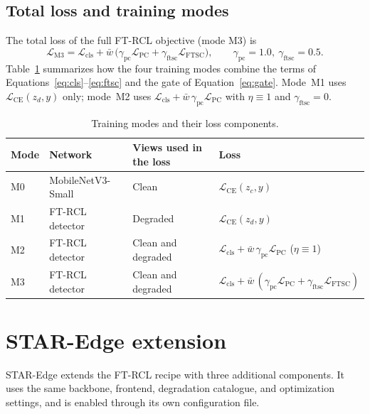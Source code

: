 \subsection{Total loss and training modes}

The total loss of the full FT-RCL objective (mode M3) is
\begin{equation}
\mathcal{L}_{\mathrm{M3}} = \mathcal{L}_{\mathrm{cls}} + \bar{w}\,\Big(\gamma_{\mathrm{pc}}\mathcal{L}_{\mathrm{PC}} + \gamma_{\mathrm{ftsc}}\mathcal{L}_{\mathrm{FTSC}}\Big), \qquad \gamma_{\mathrm{pc}} = 1.0,\ \gamma_{\mathrm{ftsc}} = 0.5 .
\label{eq:m3}
\end{equation}
Table~\ref{tab:modes} summarizes how the four training modes combine the terms of Equations~\eqref{eq:cls}--\eqref{eq:ftsc} and the gate of Equation~\eqref{eq:gate}. Mode~M1 uses $\mathcal{L}_{\mathrm{CE}}(z_d,y)$ only; mode~M2 uses $\mathcal{L}_{\mathrm{cls}} + \bar{w}\,\gamma_{\mathrm{pc}}\mathcal{L}_{\mathrm{PC}}$ with $\eta \equiv 1$ and $\gamma_{\mathrm{ftsc}} = 0$.

\begin{table}[htbp]
\centering
\caption{Training modes and their loss components.}
\label{tab:modes}
\small
\renewcommand{\arraystretch}{1.2}
\begin{tabular}{@{}llll@{}}
\toprule
Mode & Network & Views used in the loss & Loss \\
\midrule
M0 & MobileNetV3-Small & Clean & $\mathcal{L}_{\mathrm{CE}}(z_c,y)$ \\
M1 & FT-RCL detector & Degraded & $\mathcal{L}_{\mathrm{CE}}(z_d,y)$ \\
M2 & FT-RCL detector & Clean and degraded & $\mathcal{L}_{\mathrm{cls}} + \bar{w}\,\gamma_{\mathrm{pc}}\mathcal{L}_{\mathrm{PC}}$ ($\eta\equiv 1$) \\
M3 & FT-RCL detector & Clean and degraded & $\mathcal{L}_{\mathrm{cls}} + \bar{w}\,(\gamma_{\mathrm{pc}}\mathcal{L}_{\mathrm{PC}} + \gamma_{\mathrm{ftsc}}\mathcal{L}_{\mathrm{FTSC}})$ \\
\bottomrule
\end{tabular}
\end{table}

\section{STAR-Edge extension}
\label{sec:star-edge-method}

STAR-Edge extends the FT-RCL recipe with three additional components. It uses the same backbone, frontend, degradation catalogue, and optimization settings, and is enabled through its own configuration file.

